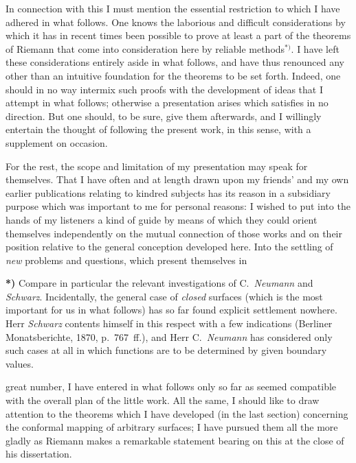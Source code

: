 \documentclass{article}
\begin{document}
In connection with this I must mention the essential restriction to which I have adhered in what follows. One knows the laborious and difficult considerations by which it has in recent times been possible to prove at least a part of the theorems of Riemann that come into consideration here by reliable methods${}^{*)}$. I have left these considerations entirely aside in what follows, and have thus renounced any other than an intuitive foundation for the theorems to be set forth. Indeed, one should in no way intermix such proofs with the development of ideas that I attempt in what follows; otherwise a presentation arises which satisfies in no direction. But one should, to be sure, give them afterwards, and I willingly entertain the thought of following the present work, in this sense, with a supplement on occasion.

For the rest, the scope and limitation of my presentation may speak for themselves. That I have often and at length drawn upon my friends' and my own earlier publications relating to kindred subjects has its reason in a subsidiary purpose which was important to me for personal reasons: I wished to put into the hands of my listeners a kind of guide by means of which they could orient themselves independently on the mutual connection of those works and on their position relative to the general conception developed here. Into the settling of \emph{new} problems and questions, which present themselves in

\textbf{*)} Compare in particular the relevant investigations of C.\ \emph{Neumann} and \emph{Schwarz}. Incidentally, the general case of \emph{closed} surfaces (which is the most important for us in what follows) has so far found explicit settlement nowhere. Herr \emph{Schwarz} contents himself in this respect with a few indications (Berliner Monatsberichte, 1870, p.~767~ff.), and Herr C.\ \emph{Neumann} has considered only such cases at all in which functions are to be determined by given boundary values.

great number, I have entered in what follows only so far as seemed compatible with the overall plan of the little work. All the same, I should like to draw attention to the theorems which I have developed (in the last section) concerning the conformal mapping of arbitrary surfaces; I have pursued them all the more gladly as Riemann makes a remarkable statement bearing on this at the close of his dissertation.
\end{document}
